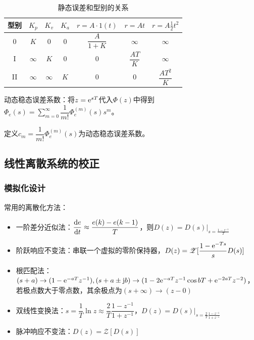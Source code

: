 \documentclass[11pt,a4paper]{ctexart}
\renewcommand{\d}{{\rm d}}
\newcommand{\e}{{\rm e}}
\renewcommand{\j}{{\rm j}}
\begin{document}
            \begin{table}[H]
                \centering
                \caption{静态误差和型别的关系}
                \begin{tabular}{|c|c|c|c|c|c|c|}
                    \hline
                    型别 & $K_p$ & $K_v$ & $K_a$ & $r=A\cdot1(t)$ & $r=At$ & $r=A\frac{1}{2}t^2$\\
                    \hline
                    0 & $K$ & $0$ & $0$ & $\dfrac{A}{1+K}$ & $\infty$ & $\infty$ \\
                    \hline
                    I & $\infty$ & $K$ & $0$ & $0$ & $\dfrac{AT}{K}$ & $\infty$ \\
                    \hline
                    II & $\infty$ & $\infty$ & $K$ & $0$ & $0$ & $\dfrac{AT^2}{K}$ \\
                    \hline
                \end{tabular}
            \end{table}

            动态稳态误差系数：将$z=\e^{sT}$代入$\varPhi(z)$中得到$\varPhi_e(s)=\sum\limits_{m=0}^{\infty}\dfrac{1}{m!}\varPhi_e^{(m)}(s)s^m$。

            定义$c_m=\dfrac{1}{m!}\varPhi_e^{(m)}(s)$为动态稳态误差系数。
    \subsection{线性离散系统的校正}
        \subsubsection{模拟化设计}
            常用的离散化方法：
            \begin{itemize}
                \item 一阶差分近似法：$\dfrac{\d e}{\d t}\approx\dfrac{e(k)-e(k-1)}{T}$，则$D(z)=D(s)|_{s=\frac{1-z^{-1}}{T}}$\
                \item 阶跃响应不变法：串联一个虚拟的零阶保持器，$D(z)=\mathscr{Z}[\dfrac{1-\e^{-Ts}}{s}D(s)]$
                \item 根匹配法：$(s+a)\rightarrow(1-\e^{-aT}z^{-1}),(s+a\pm\j b)\rightarrow(1-2\e^{-aT}z^{-1}\cos bT+\e^{-2aT}z^{-2})$，若极点数大于零点数，其余极点为$(s+\infty)\rightarrow(z-0)$
                \item 双线性变换法：$s=\dfrac{1}{T}\ln z\approx\dfrac{2}{T}\dfrac{1-z^{-1}}{1+z^{-1}}$，$D(z)=D(s)|_{s=\frac{2}{T}\frac{1-z^{-1}}{1+z^{-1}}}$
                \item 脉冲响应不变法：$D(z)=\mathscr{Z}[D(s)]$
            \end{itemize}
\end{document}
